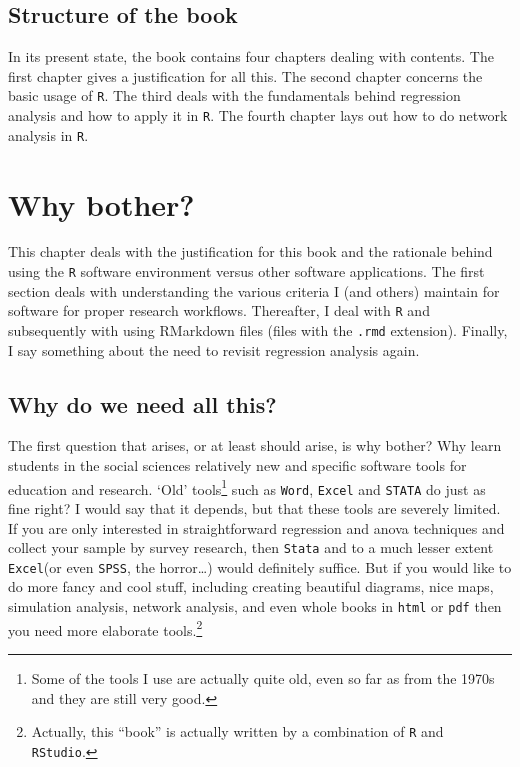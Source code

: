 \documentclass[]{article}
\let\rmarkdownfootnote\footnote%
\def\footnote{\protect\rmarkdownfootnote}
\theoremstyle{definition}
\theoremstyle{definition}
\theoremstyle{definition}
\theoremstyle{remark}
\begin{document}
\subsection{Structure of the book}\label{structure-of-the-book}

In its present state, the book contains four chapters dealing with
contents. The first chapter gives a justification for all this. The
second chapter concerns the basic usage of \texttt{R}. The third deals
with the fundamentals behind regression analysis and how to apply it in
\texttt{R}. The fourth chapter lays out how to do network analysis in
\texttt{R}.

\section{Why bother?}\label{why-bother}

This chapter deals with the justification for this book and the
rationale behind using the \texttt{R} software environment versus other
software applications. The first section deals with understanding the
various criteria I (and others) maintain for software for proper
research workflows. Thereafter, I deal with \texttt{R} and subsequently
with using RMarkdown files (files with the \texttt{.rmd} extension).
Finally, I say something about the need to revisit regression analysis
again.

\subsection{Why do we need all this?}\label{why-do-we-need-all-this}

The first question that arises, or at least should arise, is why bother?
Why learn students in the social sciences relatively new and specific
software tools for education and research. `Old' tools\footnote{Some of
  the tools I use are actually quite old, even so far as from the 1970s
  and they are still very good.} such as \texttt{Word}, \texttt{Excel}
and \texttt{STATA} do just as fine right? I would say that it depends,
but that these tools are severely limited. If you are only interested in
straightforward regression and anova techniques and collect your sample
by survey research, then \texttt{Stata} and to a much lesser extent
\texttt{Excel}(or even \texttt{SPSS}, the horror\ldots{}) would
definitely suffice. But if you would like to do more fancy and cool
stuff, including creating beautiful diagrams, nice maps, simulation
analysis, network analysis, and even whole books in \texttt{html} or
\texttt{pdf} then you need more elaborate tools.\footnote{Actually, this
  ``book'' is actually written by a combination of \texttt{R} and
  \texttt{RStudio}.}
\end{document}
